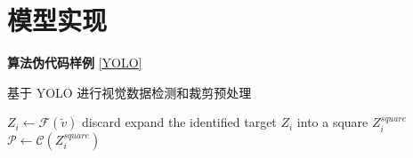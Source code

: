 \chapter{模型实现}
\label{chap04}
\sloppy{}

\textbf{算法伪代码样例} \ref{YOLO}

\begin{algorithm}
\caption{基于 YOLO 进行视觉数据检测和裁剪预处理}
\label{YOLO}
\begin{algorithmic}[1] %

    \STATE $Z_i \gets \mathcal{F}(\widetilde{v})$
        \STATE discard
    \ENDIF
    \STATE expand the identified target $Z_i$ into a square $Z_i^{square}$
    \STATE $\mathcal{P} \gets \mathcal{C}(Z_i^{square})$
\ENDFOR
\end{algorithmic}
\end{algorithm}